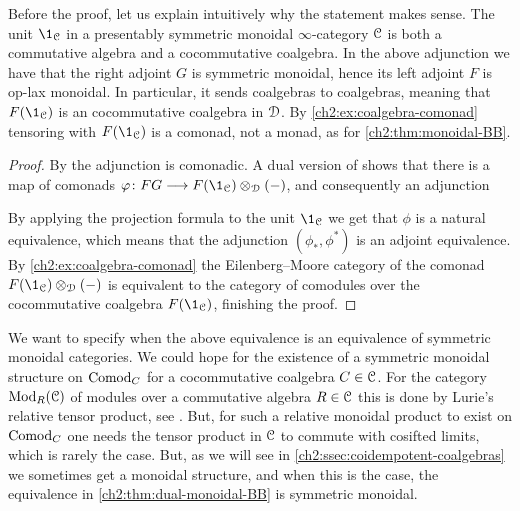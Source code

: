\begin{remark}
    Before the proof, let us explain intuitively why the statement makes sense. The unit $\1_\C$ in a presentably symmetric monoidal $\infty$-category $\EuScript{C}$ is both a commutative algebra and a cocommutative coalgebra. In the above adjunction we have that the right adjoint $G$ is symmetric monoidal, hence its left adjoint $F$ is op-lax monoidal. In particular, it sends coalgebras to coalgebras, meaning that $F(\1_\C)$ is an cocommutative coalgebra in $\EuScript{D}$. By \cref{ch2:ex:coalgebra-comonad} tensoring with $F(\1_\C)$ is a comonad, not a monad, as for \cref{ch2:thm:monoidal-BB}. 
\end{remark}

\begin{proof}
    By \cite[4.5]{brantner-mathew_2023} the adjunction is comonadic. A dual version of \cite[3.6]{elmanto-kolderup_2020} shows that there is a map of comonads $\phi\: FG \to F(\1_\C)\otimes_\D (-)$, and consequently an adjunction 
    \begin{center}
    \end{center}
    By applying the projection formula to the unit $\1_\C$ we get that $\phi$ is a natural equivalence, which means that the adjunction $(\phi_*, \phi^*)$ is an adjoint equivalence. By \cref{ch2:ex:coalgebra-comonad} the Eilenberg--Moore category of the comonad $F(\1_\C)\otimes_\D (-)$ is equivalent to the category of comodules over the cocommutative coalgebra $F(\1_\C)$, finishing the proof. 
\end{proof}

\begin{remark}
    \label{ch2:rm:monoidal-structure-comodules}
    We want to specify when the above equivalence is an equivalence of symmetric monoidal categories. We could hope for the existence of a symmetric monoidal structure on $\mathrm{Comod}_C$ for a cocommutative coalgebra $C\in \EuScript{C}$. For the category $\mathrm{Mod}_R(\EuScript{C})$ of modules over a commutative algebra $R\in \EuScript{C}$ this is done by Lurie's relative tensor product, see \cite[Section 4.5.2]{Lurie_HA}. But, for such a relative monoidal product to exist on $\mathrm{Comod}_C$ one needs the tensor product in $\EuScript{C}$ to commute with cosifted limits, which is rarely the case. But, as we will see in \cref{ch2:ssec:coidempotent-coalgebras} we sometimes get a monoidal structure, and when this is the case, the equivalence in \cref{ch2:thm:dual-monoidal-BB} is symmetric monoidal. 
\end{remark}

